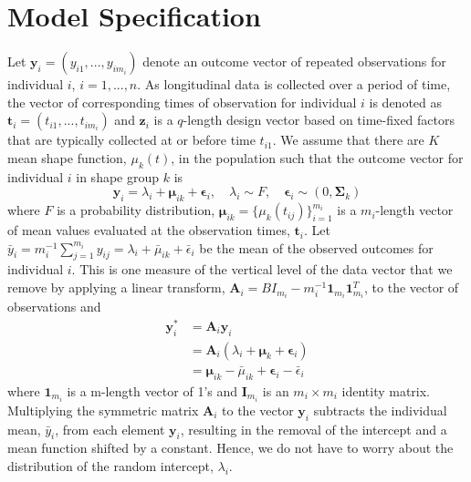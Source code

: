 \documentclass[12pt]{article}
\newcommand{\B}[0]{\mathbf}
\newcommand{\bs}[0]{\boldsymbol}
\begin{document}
\section{Model Specification}
 Let $\B y_{i}=(y_{i1},...,y_{im_{i}})$ denote an outcome vector of repeated observations for individual $i$, $i=1,...,n$. As longitudinal data is collected over a period of time, the vector of corresponding times of observation for individual $i$ is denoted as $\B t_{i}=(t_{i1},...,t_{im_{i}})$ and $\B z_{i}$ is a $q$-length design vector based on time-fixed factors that are typically collected at or before time $t_{i1}$. We assume that there are $K$ mean shape function, $\mu_{k}(t)$, in the population such that the outcome vector for individual $i$ in shape group $k$ is
 $$\B y_{i} = \lambda_{i}+\bs\mu_{ik}+\bs\epsilon_{i},\quad \lambda_{i}\sim F, \quad \bs\epsilon_{i}\sim(0,\bs\Sigma_{k})$$
 where $F$ is a probability distribution, $\bs\mu_{ik} = \{\mu_{k}(t_{ij})\}_{i=1}^{m_{i}}$ is a $m_{i}$-length vector of mean values evaluated at the observation times, $\B t_{i}$. Let $\bar{y}_{i}= m_{i}^{-1}\sum^{m_{i}}_{j=1} y_{ij} = \lambda_{i}+\bar{\mu}_{ik}+\bar{\epsilon}_{i}$ be the mean of the observed outcomes for individual $i$. This is one measure of the vertical level of the data vector that we remove by applying a linear transform, $\B A_{i} = B I_{m_{i}} - m_{i}^{-1}\B 1_{m_{i}}\B 1_{m_{i}}^{T}$, to the vector of observations and 
\begin{align*}
\B y^{*}_{i} &= \B A_{i}\B y_{i}\\
&=\B A_{i}(\lambda_{i}+\bs\mu_{k}+\bs\epsilon_{i})\\
&=\bs\mu_{ik}-\bar{\mu}_{ik}+\bs\epsilon_{i}-\bar{\epsilon}_{i}
\end{align*}
where $\B 1_{m_{i}}$ is a m-length vector of 1's and $\B I_{m_{i}}$ is an $m_{i}\times m_{i}$ identity matrix. Multiplying the symmetric matrix $\B A_{i}$ to the vector $\B y_{i}$ subtracts the individual mean, $\bar{y}_{i}$, from each element $\B y_{i}$, resulting in the removal of the intercept and a mean function shifted by a constant. Hence, we do not have to worry about the distribution of the random intercept, $\lambda_{i}$.
\end{document}
